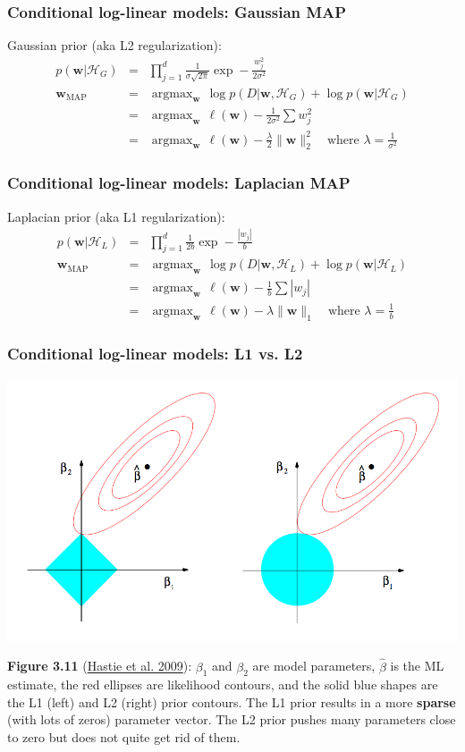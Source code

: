 \documentclass[ignorenonframetext,plain,fleqn]{beamer}
\DeclareMathOperator*{\argmax}{argmax}
\renewcommand{\vec}{\mathbf}
\begin{document}
\begin{frame}\frametitle{Conditional log-linear models: Gaussian MAP} %
Gaussian prior (aka L2 regularization):\begin{eqnarray*}
p(\vec{w}|\mathcal{H}_G) &=& \prod_{j=1}^d \frac{1}{\sigma \sqrt{2\pi}}
\exp -\frac{w_j^2}{2\sigma^2} \\
\vec{w}_\text{MAP} &=& \argmax_\vec{w}\, \log p(D|\vec{w},\mathcal{H}_G)
+ \log p(\vec{w}|\mathcal{H}_G) \\
&=& \argmax_\vec{w}\, \ell(\vec{w}) -\frac{1}{2\sigma^2}\sum w_j^2 \\
&=& \argmax_\vec{w}\, \ell(\vec{w}) - \frac{\lambda}{2}\|\vec{w}\|_2^2 \quad\text{where }\lambda=\frac{1}{\sigma^2}
\end{eqnarray*}
\end{frame}
\begin{frame}\frametitle{Conditional log-linear models: Laplacian MAP} %
Laplacian prior (aka L1 regularization):\begin{eqnarray*}
p(\vec{w}|\mathcal{H}_L) &=& \prod_{j=1}^d \frac{1}{2b} \exp -\frac{|w_j|}{b}\\
\vec{w}_\text{MAP} &=& \argmax_\vec{w}\, \log p(D|\vec{w},\mathcal{H}_L)
+ \log p(\vec{w}|\mathcal{H}_L) \\
&=& \argmax_\vec{w}\, \ell(\vec{w}) -\frac{1}{b}\sum |w_j| \\
&=& \argmax_\vec{w}\, \ell(\vec{w}) - \lambda \|\vec{w}\|_1 \quad\text{where }\lambda=\frac{1}{b}
\end{eqnarray*}
\end{frame}

\begin{frame}\frametitle{Conditional log-linear models: L1 vs. L2} %
\includegraphics[width=.9\textwidth]{images/hastie-fig-3-11.png}

\footnotesize {\bf Figure 3.11}
(\href{http://www-stat.stanford.edu/~tibs/ElemStatLearn}{Hastie et
  al. 2009}): $\beta_1$ and $\beta_2$ are model parameters,
$\hat{\beta}$ is the ML estimate, the red ellipses are likelihood
contours, and the solid blue shapes are the L1 (left) and L2 (right)
prior contours.  The L1 prior results in a more {\bf sparse} (with
lots of zeros) parameter vector.  The L2 prior pushes many parameters
close to zero but does not quite get rid of them.
\end{frame}
\end{document}
